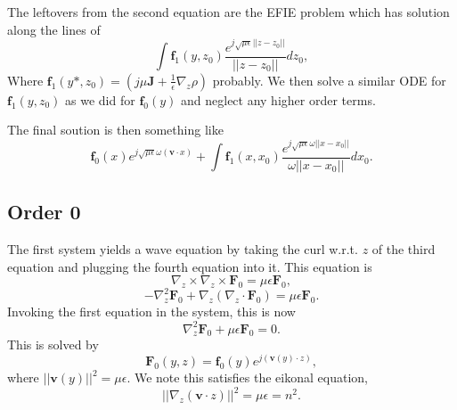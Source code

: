 \documentclass{article}
\newcommand{\norm}[1]{||#1||}
\theoremstyle{plain}
\begin{document}
The leftovers from the second equation are the EFIE problem which has solution along the lines of
\begin{equation*}
	\int\mathbf{f}_1(y,z_0) \frac{ e^{j\sqrt{\mu\epsilon}\norm{z-z_0}} }{ \norm{z-z_0} } dz_0,
\end{equation*}
Where $\mathbf{f}_1(y*,z_0) = \left( j\mu\mathbf{J} + \frac{1}{\epsilon}\nabla_z\rho \right)$ probably. We then solve a similar ODE for $\mathbf{f}_1(y,z_0)$ as we did for $\mathbf{f}_0(y)$ and neglect any higher order terms.

The final soution is then something like
\begin{equation*}
	\mathbf{f}_0(x)e^{j\sqrt{\mu\epsilon}\omega\left(\mathbf{v}\cdot{x}\right)} + \int\mathbf{f}_1(x,x_0) \frac{ e^{j\sqrt{\mu\epsilon}\omega\norm{x-x_0}} }{ \omega\norm{x-x_0} } dx_0.
\end{equation*}



\subsection{Order 0}

The first system yields a wave equation by taking the curl w.r.t. $z$ of the third equation and plugging the fourth equation into it. This equation is
\begin{equation*}
	\nabla_z\times\nabla_z\times\mathbf{F}_0 = \mu\epsilon\mathbf{F}_0,
\end{equation*}
\begin{equation}
	-\nabla_z^2\mathbf{F}_0 + \nabla_z\left(\nabla_z\cdot\mathbf{F}_0\right) = \mu\epsilon\mathbf{F}_0.
\end{equation}
Invoking the first equation in the system, this is now
\begin{equation}
	\nabla_z^2\mathbf{F}_0 + \mu\epsilon\mathbf{F}_0 = 0.
\end{equation}
This is solved by
\begin{equation}
	\mathbf{F}_0(y,z) = \mathbf{f}_0(y)e^{j\left(\mathbf{v}(y)\cdot z\right)},
\end{equation}
where $\norm{\mathbf{v}(y)}^2=\mu\epsilon$. We note this satisfies the eikonal equation,
\begin{equation}
	\norm{\nabla_z \left(\mathbf{v}\cdot z\right) }^2 = \mu\epsilon = n^2.
\end{equation}
\end{document}
